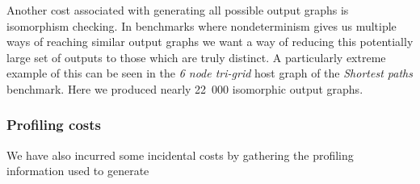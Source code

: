 Another cost associated with generating all possible output graphs is isomorphism checking. In benchmarks where nondeterminism gives us multiple ways of reaching similar output graphs we want a way of reducing this potentially large set of outputs to those which are truly distinct. A particularly extreme example of this can be seen in the \textit{6 node tri-grid} host graph of the \textit{Shortest paths} benchmark. Here we produced nearly 22~000 isomorphic output graphs.


\subsubsection*{Profiling costs}

We have also incurred some incidental costs by gathering the profiling information used to generate 









